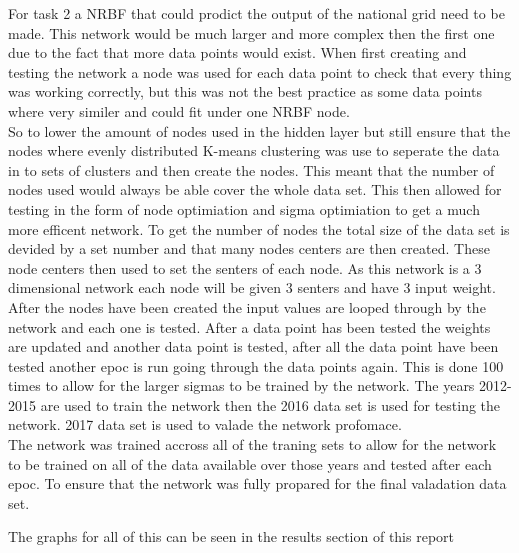 \documentclass{IEEEtran}
\begin{document}
\begin{flushleft}
  For task 2 a NRBF that could prodict the output of the national grid need to be made.
  This network would be much larger and more complex then the first one due to the fact that more
  data points would exist. When first creating and testing the network a node was used for each
  data point to check that every thing was working correctly, but this was not the best practice
  as some data points where very similer and could fit under one NRBF node.
  \\
  \vspace{2.5mm}
  So to lower the amount of nodes used in the hidden layer but still ensure that the nodes where
  evenly distributed K-means clustering was use to seperate the data in to sets of clusters and then
  create the nodes. This meant that the number of nodes used would always be able cover the whole data set.
  This then allowed for testing in the form of node optimiation and sigma optimiation to get a much more
  efficent network. To get the number of nodes the total size of the data set is devided by a set number
  and that many nodes centers are then created. These node centers then used to set the senters of each node.
  As this network is a 3 dimensional network each node will be given 3 senters and have 3 input weight.
  \\
  \vspace{2.5mm}
  After the nodes have been created the input values are looped through by the network and each one is tested.
  After a data point has been tested the weights are updated and another data point is tested, after all the data point
  have been tested another epoc is run going through the data points again. This is done 100 times to allow
  for the larger sigmas to be trained by the network. The years 2012-2015 are used to train the network then the 2016
  data set is used for testing the network. 2017 data set is used to valade the network profomace.
  \\
  \vspace{2.5mm}
  The network was trained accross all of the traning sets to allow for the network to be trained on all of the data
  available over those years and tested after each epoc. To ensure that the network was fully propared for the
  final valadation data set.

  The graphs for all of this can be seen in the results section of this report

\end{flushleft}
\end{document}
